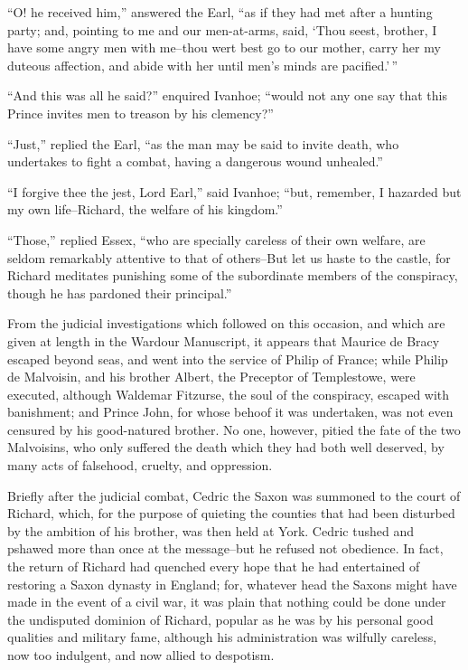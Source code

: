 ``O! he received him,'' answered the Earl, ``as if they had met after a
hunting party; and, pointing to me and our men-at-arms, said, `Thou
seest, brother, I have some angry men with me--thou wert best go to our
mother, carry her my duteous affection, and abide with her until men's
minds are pacified.'\,''

``And this was all he said?'' enquired Ivanhoe; ``would not any one say
that this Prince invites men to treason by his clemency?''

``Just,'' replied the Earl, ``as the man may be said to invite death,
who undertakes to fight a combat, having a dangerous wound unhealed.''

``I forgive thee the jest, Lord Earl,'' said Ivanhoe; ``but, remember, I
hazarded but my own life--Richard, the welfare of his kingdom.''

``Those,'' replied Essex, ``who are specially careless of their own
welfare, are seldom remarkably attentive to that of others--But let us
haste to the castle, for Richard meditates punishing some of the
subordinate members of the conspiracy, though he has pardoned their
principal.''

From the judicial investigations which followed on this occasion, and
which are given at length in the Wardour Manuscript, it appears that
Maurice de Bracy escaped beyond seas, and went into the service of
Philip of France; while Philip de Malvoisin, and his brother Albert, the
Preceptor of Templestowe, were executed, although Waldemar Fitzurse, the
soul of the conspiracy, escaped with banishment; and Prince John, for
whose behoof it was undertaken, was not even censured by his
good-natured brother. No one, however, pitied the fate of the two
Malvoisins, who only suffered the death which they had both well
deserved, by many acts of falsehood, cruelty, and oppression.

Briefly after the judicial combat, Cedric the Saxon was summoned to the
court of Richard, which, for the purpose of quieting the counties that
had been disturbed by the ambition of his brother, was then held at
York. Cedric tushed and pshawed more than once at the message--but he
refused not obedience. In fact, the return of Richard had quenched every
hope that he had entertained of restoring a Saxon dynasty in England;
for, whatever head the Saxons might have made in the event of a civil
war, it was plain that nothing could be done under the undisputed
dominion of Richard, popular as he was by his personal good qualities
and military fame, although his administration was wilfully careless,
now too indulgent, and now allied to despotism.

